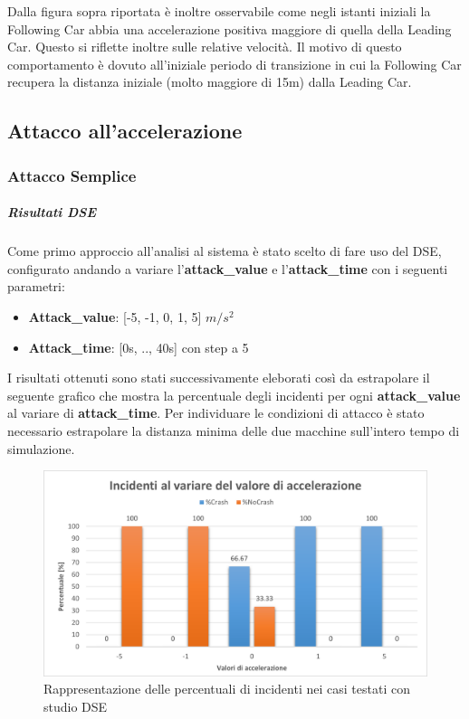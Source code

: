 Dalla figura sopra riportata è inoltre osservabile come negli istanti iniziali la Following Car abbia una accelerazione positiva maggiore di quella della Leading Car. Questo si riflette inoltre sulle relative velocità. Il motivo di questo comportamento è dovuto all'iniziale periodo di transizione in cui la Following Car recupera la distanza iniziale (molto maggiore di 15m) dalla Leading Car. 

\subsection{Attacco all'accelerazione}
\subsubsection{Attacco Semplice}
\subparagraph{Risultati DSE}
Come primo approccio all'analisi al sistema è stato scelto di fare uso del DSE, configurato andando a variare l'\textbf{attack\_value} e l'\textbf{attack\_time} con i seguenti parametri:
\begin{itemize}
	\item \textbf{Attack\_value}: [-5, -1, 0, 1, 5] $m/s^2$
	\item \textbf{Attack\_time}: [0s, .., 40s] con step a 5
\end{itemize}
I risultati ottenuti sono stati successivamente eleborati così da estrapolare il seguente grafico che mostra la percentuale degli incidenti per ogni \textbf{attack\_value} al variare di \textbf{attack\_time}. Per individuare le condizioni di attacco è stato necessario estrapolare la distanza minima delle due macchine sull'intero tempo di simulazione.

\begin{figure}[H]
	\centering
	\includegraphics[width=\textwidth]{img/PlotPercentageIncidenteAttackAccel.png}
	\caption{Rappresentazione delle percentuali di incidenti nei casi testati con studio DSE}
\end{figure}


